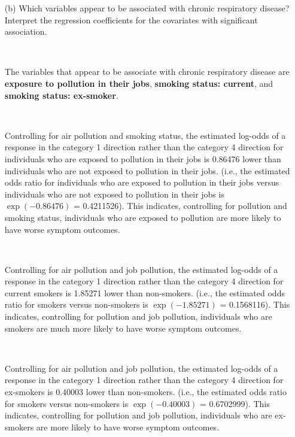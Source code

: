 \documentclass[]{article}
\begin{document}
\begin{itemize}
\item[(b)] Which variables appear to be associated with chronic respiratory disease?  Interpret the regression coefficients for the covariates with significant association. 

 \ 
 
 The variables that appear to be associate with chronic respiratory disease are {\bf exposure to pollution in their jobs}, {\bf smoking status: current}, and {\bf smoking status: ex-smoker}.
 
 \ 
 
 Controlling for air pollution and smoking status, the estimated log-odds of a response in the category 1 direction rather than the category 4 direction for individuals who are exposed to pollution in their jobs is 0.86476 lower than individuals who are not exposed to pollution in their jobs. (i.e., the estimated odds ratio for individuals who are exposed to pollution in their jobs versus individuals who are not exposed to pollution in their jobs is $\exp(-0.86476)$ = 0.4211526). This indicates, controlling for pollution and smoking status, individuals who are exposed to pollution are more likely to have worse symptom outcomes.
 
 
 
\ 

 Controlling for air pollution and job pollution, the estimated log-odds of a response in the category 1 direction rather than the category 4 direction for current smokers is 1.85271 lower than non-smokers. (i.e., the estimated odds ratio for smokers versus non-smokers is $\exp(-1.85271)$ = 0.1568116). This indicates, controlling for pollution and job pollution, individuals who are smokers are much more  likely to have worse symptom outcomes.

 
 
\ 

 Controlling for air pollution and job pollution, the estimated log-odds of a response in the category 1 direction rather than the category 4 direction for ex-smokers is 0.40003 lower than non-smokers. (i.e., the estimated odds ratio for smokers versus non-smokers is $\exp(-0.40003)$ = 0.6702999). This indicates, controlling for pollution and job pollution, individuals who are ex-smokers are more likely to have worse symptom outcomes.


\end{itemize}

~
\end{document}
